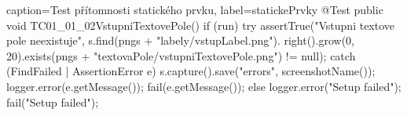 \begin{lstjava}{caption={Test přítomnosti statického prvku}, label={statickePrvky}}
@Test
public void TC01_01_02VstupniTextovePole() {
  if (run) {
    try {
      assertTrue("Vstupni textove pole neexistuje",
        s.find(pngs + "labely/vstupLabel.png").
        right().grow(0, 20).exists(pngs +
        "textovaPole/vstupniTextovePole.png") !=
        null);
    } catch (FindFailed | AssertionError e) {
      s.capture().save("errors", screenshotName());
      logger.error(e.getMessage());
      fail(e.getMessage());
    }
  } else {
    logger.error("Setup failed");
    fail("Setup failed");
  }
}
\end{lstjava}